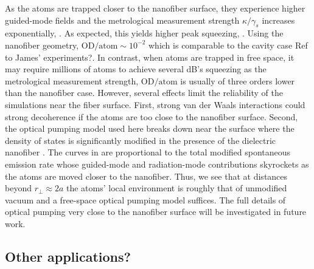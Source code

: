 \documentclass[preprint,aps,pra,onecolumn]{revtex4-1} %
\newcommand{\comment}[1]{{\color{Maroon} #1}}
\begin{document}
As the atoms are trapped closer to the nanofiber surface, they experience higher guided-mode fields and the metrological measurement strength $ \kappa/\gamma_s $ increases exponentially, . 
As expected, this yields higher peak squeezing, . 
Using the nanofiber geometry, $ \mathrm{OD}/\mathrm{atom}\sim 10^{-2} $ which is comparable to the cavity case \comment{Ref to James' experiments?}.
In contrast, when atoms are trapped in free space, it may require millions of atoms to achieve several dB's squeezing as the metrological measurement strength, $ \mathrm{OD}/\mathrm{atom} $ is usually of three orders lower than the nanofiber case. 
However, several effects limit the reliability of the simulations near the fiber surface. 
First, strong van der Waals interactions could strong decoherence if the atoms are too close to the nanofiber surface.  
Second, the optical pumping model used here breaks down near the surface where the density of states is significantly modified in the presence of the dielectric nanofiber \cite{}. 
The curves in  are proportional to the total modified spontaneous emission rate whose guided-mode and radiation-mode contributions skyrockets as the atoms are moved closer to the nanofiber. 
Thus, we see that at distances beyond $r_\perp \approx 2a$ the atoms' local environment is roughly that of unmodified vacuum and a free-space optical pumping model suffices. 
The full details of optical pumping very close to the nanofiber surface will be investigated in future work.


\subsection{Other applications?} 
\end{document}
